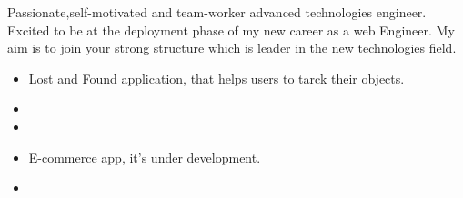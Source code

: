 \documentclass[10pt,a4paper,ragged2e,withhyper]{altacv}
\begin{document}
\begin{paracol}{2}

\switchcolumn


Passionate,self-motivated and team-worker advanced technologies engineer. Excited to be at the deployment phase of my new career as a web Engineer. My aim is to join your strong structure which is leader in the new technologies field.

            \begin{itemize}
                 \item Lost and Found application, that helps users to tarck their objects.
                \item 
                \item 
            \end{itemize}
            
            \divider
            \begin{itemize}
                \item E-commerce app, it's under development. 
                \item 
            \end{itemize}
              \\
               \smallskip
              
                
            
            

\end{paracol}
\end{document}
